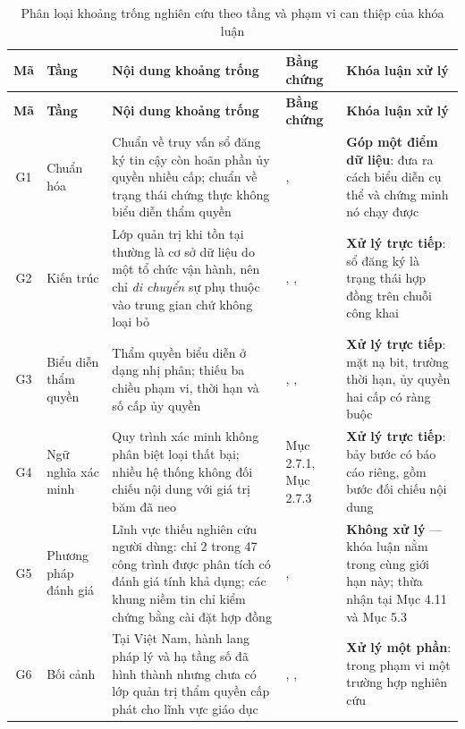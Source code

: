 \begin{longtable}{|c|p{2.9cm}|p{4.4cm}|p{2.5cm}|p{2.6cm}|}
\caption{Phân loại khoảng trống nghiên cứu theo tầng và phạm vi can thiệp của khóa luận}
\label{tab:gap-taxonomy} \\

\hline
\textbf{Mã} & \textbf{Tầng} & \textbf{Nội dung khoảng trống} & \textbf{Bằng chứng} & \textbf{Khóa luận xử lý} \\
\hline
\endfirsthead

\hline
\textbf{Mã} & \textbf{Tầng} & \textbf{Nội dung khoảng trống} & \textbf{Bằng chứng} & \textbf{Khóa luận xử lý} \\
\hline
\endhead

\hline
\endfoot

\hline
\endlastfoot

G1 & Chuẩn hóa
& Chuẩn về truy vấn sổ đăng ký tin cậy còn hoãn phần ủy quyền nhiều cấp; chuẩn về trạng thái chứng thực không biểu diễn thẩm quyền
& \cite{ToIP_TRQP2026}, \cite{W3C_BitstringStatusList2025}
& \textbf{Góp một điểm dữ liệu}: đưa ra cách biểu diễn cụ thể và chứng minh nó chạy được
\\ \hline

G2 & Kiến trúc
& Lớp quản trị khi tồn tại thường là cơ sở dữ liệu do một tổ chức vận hành, nên chỉ \emph{di chuyển} sự phụ thuộc vào trung gian chứ không loại bỏ
& \cite{Baldi2019}, \cite{Zonneveld2026}, \cite{SSI_Survey2025}
& \textbf{Xử lý trực tiếp}: sổ đăng ký là trạng thái hợp đồng trên chuỗi công khai
\\ \hline

G3 & Biểu diễn thẩm quyền
& Thẩm quyền biểu diễn ở dạng nhị phân; thiếu ba chiều phạm vi, thời hạn và số cấp ủy quyền
& \cite{Blockcerts2016}, \cite{OpenBadges2024}, \cite{ToIP_TRQP2026}
& \textbf{Xử lý trực tiếp}: mặt nạ bit, trường thời hạn, ủy quyền hai cấp có ràng buộc
\\ \hline

G4 & Ngữ nghĩa xác minh
& Quy trình xác minh không phân biệt loại thất bại; nhiều hệ thống không đối chiếu nội dung với giá trị băm đã neo
& Mục 2.7.1, Mục 2.7.3
& \textbf{Xử lý trực tiếp}: bảy bước có báo cáo riêng, gồm bước đối chiếu nội dung
\\ \hline

G5 & Phương pháp đánh giá
& Lĩnh vực thiếu nghiên cứu người dùng: chỉ 2 trong 47 công trình được phân tích có đánh giá tính khả dụng; các khung niềm tin chỉ kiểm chứng bằng cài đặt hợp đồng
& \cite{Ambati2026}, \cite{DeSalve2023}
& \textbf{Không xử lý} --- khóa luận nằm trong cùng giới hạn này; thừa nhận tại Mục 4.11 và Mục 5.3
\\ \hline

G6 & Bối cảnh
& Tại Việt Nam, hành lang pháp lý và hạ tầng số đã hình thành nhưng chưa có lớp quản trị thẩm quyền cấp phát cho lĩnh vực giáo dục
& \cite{TT10_2026}, \cite{LuatBVDLCN2025}, \cite{NDAChain2025}
& \textbf{Xử lý một phần}: trong phạm vi một trường hợp nghiên cứu
\\ \hline

\end{longtable}

